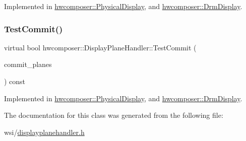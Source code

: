 Implemented in \mbox{\hyperlink{classhwcomposer_1_1PhysicalDisplay_afe0c0a304dab32918d3c40520f00d991}{hwcomposer\+::\+Physical\+Display}}, and \mbox{\hyperlink{classhwcomposer_1_1DrmDisplay_acbf817afffc6ad6f2879d914a0335dd0}{hwcomposer\+::\+Drm\+Display}}.

\mbox{\label{classhwcomposer_1_1DisplayPlaneHandler_a1135b134010e6736aa49304100c9d3b9}} 
\subsubsection{\texorpdfstring{Test\+Commit()}{TestCommit()}}
{\footnotesize\ttfamily virtual bool hwcomposer\+::\+Display\+Plane\+Handler\+::\+Test\+Commit (\begin{DoxyParamCaption}\item[{const std\+::vector$<$ \mbox{\hyperlink{structhwcomposer_1_1OverlayPlane}{Overlay\+Plane}} $>$ \&}]{commit\+\_\+planes }\end{DoxyParamCaption}) const\hspace{0.3cm}{\ttfamily [pure virtual]}}



Implemented in \mbox{\hyperlink{classhwcomposer_1_1PhysicalDisplay_a3c71b07e973c29b5603c35c333a42991}{hwcomposer\+::\+Physical\+Display}}, and \mbox{\hyperlink{classhwcomposer_1_1DrmDisplay_a7aaa318ce853a36ebcaf837fe1801f88}{hwcomposer\+::\+Drm\+Display}}.



The documentation for this class was generated from the following file\+:\begin{DoxyCompactItemize}
\item 
wsi/\mbox{\hyperlink{displayplanehandler_8h}{displayplanehandler.\+h}}\end{DoxyCompactItemize}
